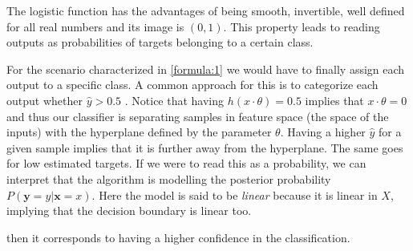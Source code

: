 The logistic function has the advantages of being smooth, invertible, well defined for all real numbers and its image is $(0,1)$. This property leads to reading outputs as probabilities of targets belonging to a certain class. 

For the scenario characterized in \ref{formula:1} we would have to finally assign each output to a specific class. A common approach for this is to categorize each output whether $\hat{y} > 0.5$ \label{formula:logitThreshold}. Notice that having $h(x \cdot \theta) = 0.5$ implies that $x \cdot  \theta = 0$ and thus our classifier is separating samples in feature space (the space of the inputs) with the hyperplane defined by the parameter $\theta$. Having a higher $\hat{y}$ for a given sample implies that it is further away from the hyperplane. The same goes for low estimated targets. If we were to read this as a probability, we can interpret that the algorithm is modelling the posterior probability $P(\textbf{y} = y | \textbf{x} = x)$. Here the model is said to be \textit{linear} because it is linear in $X$, implying that the decision boundary is linear too. 



then it corresponds to having a higher confidence in the classification.


